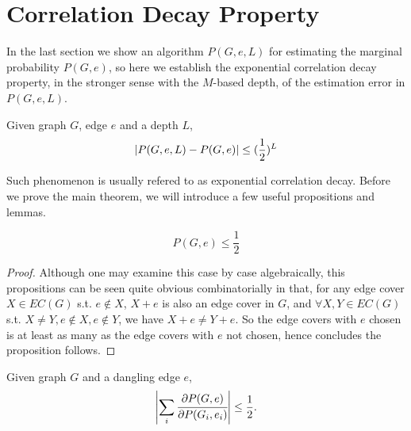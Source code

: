 \section{Correlation Decay Property}

In the last section we show an algorithm $P(G,e,L)$ for estimating the marginal probability $P(G,e)$,
so here we establish the exponential correlation decay property, in the stronger sense with the $M$-based depth, of the estimation error in $P(G,e,L)$.%

\begin{Thm}
	Given graph $G$, edge $e$ and a depth $L$,
	\[\left\vert P(G,e,L) - P(G,e)\right\vert \leq (\frac{1}{2})^{L}\]
\end{Thm}

Such phenomenon is usually refered to as exponential correlation decay. Before we prove the main theorem, we will introduce a few useful propositions and lemmas.

\begin{Prop}
	\[P(G, e) \leq \frac{1}{2}\]
\end{Prop}

\begin{proof}
	Although one may examine this case by case algebraically, this propositions can be seen quite obvious combinatorially in that, for any edge cover $X \in EC(G)$ s.t. $e \notin X$, $X+e$ is also an edge cover in $G$, and $\forall X,Y \in EC(G)$ s.t. $X \neq Y, e \notin X, e\notin Y$, we have $X+e \neq Y+e$. So the edge covers with $e$ chosen is at least as many as the edge covers with $e$ not chosen, hence concludes the proposition follows.
\end{proof}


	\begin{Lem}
		Given graph $G$ and a dangling edge $e$,
		\begin{align*}
			\left\vert\sum_i \cfrac{\partial P(G,e)}{\partial P(G_i,e_i)}\right\vert \leq \frac{1}{2}. 
		\end{align*}
	\end{Lem}

